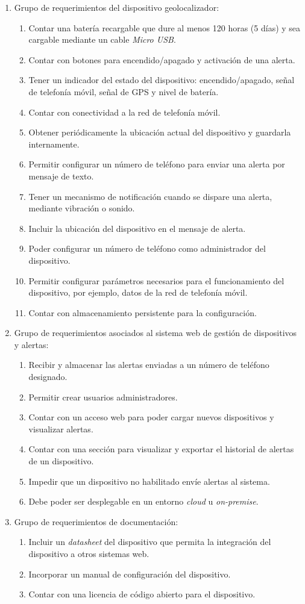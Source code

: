 \documentclass[
11pt, %
]{charter}
\begin{document}
\begin{enumerate}
\item Grupo de requerimientos del dispositivo geolocalizador:
	\begin{enumerate}
	\item Contar una batería recargable que dure al menos 120 horas (5 días) y sea cargable mediante un cable \textit{Micro USB}.
	\item Contar con botones para encendido/apagado y activación de una alerta.
	\item Tener un indicador del estado del dispositivo: encendido/apagado, señal de telefonía móvil, señal de GPS y nivel de batería.
	\item Contar con conectividad a la red de telefonía móvil.
	\item Obtener periódicamente la ubicación actual del dispositivo y guardarla internamente.
	\item Permitir configurar un número de teléfono para enviar una alerta por mensaje de texto.
	\item Tener un mecanismo de notificación cuando se dispare una alerta, mediante vibración o sonido.
	\item Incluir la ubicación del dispositivo en el mensaje de alerta.
	\item Poder configurar un número de teléfono como administrador del dispositivo.
	\item Permitir configurar parámetros necesarios para el funcionamiento del dispositivo, por ejemplo, datos de la red de telefonía móvil.
	\item Contar con almacenamiento persistente para la configuración.
	\end{enumerate}
\item Grupo de requerimientos asociados al sistema web de gestión de dispositivos y alertas:
	\begin{enumerate}
	\item Recibir y almacenar las alertas enviadas a un número de teléfono designado.
	\item Permitir crear usuarios administradores.
	\item Contar con un acceso web para poder cargar nuevos dispositivos y visualizar alertas.
	\item Contar con una sección para visualizar y exportar el historial de alertas de un dispositivo.
	\item Impedir que un dispositivo no habilitado envíe alertas al sistema.
	\item Debe poder ser desplegable en un entorno \textit{cloud} u \textit{on-premise}.
	\end{enumerate}
\item Grupo de requerimientos de documentación:
	\begin{enumerate}
	\item Incluir un \textit{datasheet} del dispositivo que permita la integración del dispositivo a otros sistemas web.
	\item Incorporar un manual de configuración del dispositivo.
	\item Contar con una licencia de código abierto para el dispositivo.
	\end{enumerate}
\end{enumerate}
\end{document}
